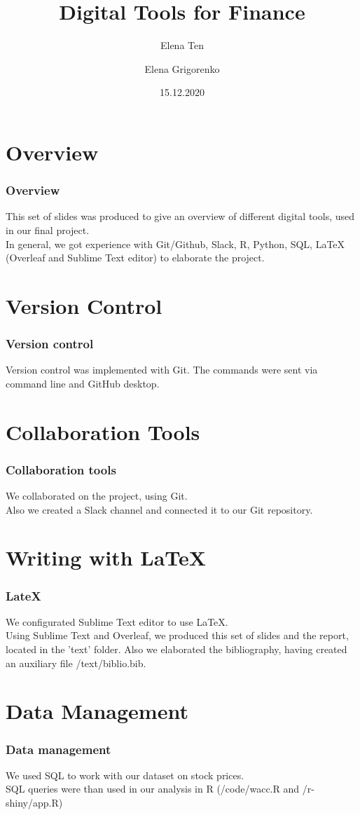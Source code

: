 \documentclass {beamer}
\title{Digital Tools for Finance}
\author [Ten, Grigorenko] {Elena Ten \and Elena Grigorenko}
\institute [UZH] {University of Zurich}
\date {15.12.2020}
\begin{document}
\frame{\titlepage}

\section{Overview}
\begin{frame}
\frametitle{Overview}
This set of slides was produced to give an overview of different digital tools, used in our final project.\\
In general, we got experience with Git/Github, Slack, R, Python, SQL, LaTeX (Overleaf and Sublime Text editor) to elaborate the project. 

\end{frame}



\section{Version Control}
\begin{frame}
\frametitle{Version control}
Version control was implemented with Git. The commands were sent via command line and GitHub desktop.

\end{frame}


\section{Collaboration Tools}
\begin{frame}
\frametitle{Collaboration tools}
We collaborated on the project, using Git.\\
Also we created a Slack channel and connected it to our Git repository.

\end{frame}


\section{Writing with LaTeX}
\begin{frame}
\frametitle{LateX}
We configurated Sublime Text editor to use LaTeX.\\
Using Sublime Text and Overleaf, we produced this set of slides and the report, located in the 'text' folder.
Also we elaborated the bibliography, having created an auxiliary file /text/biblio.bib.


\end{frame}

\section{Data Management}
\begin{frame}
\frametitle{Data management}
We used SQL to work with our dataset on stock prices.\\
SQL queries were than used in our analysis in R (/code/wacc.R and /r-shiny/app.R)

\end{frame}
\end{document}
